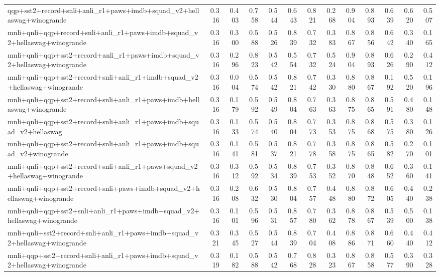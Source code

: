 \begin{table}[t]
\begin{tabular}{lrrrrrrrrrrrr}
    qqp+sst2+record+snli+anli\_r1+paws+imdb+squad\_v2+hellaswag+winogrande & 0.316 & 0.403 & 0.758 & 0.544 & 0.643 & 0.821 & 0.268 & 0.904 & 0.893 & 0.639 & 0.620 & 0.507 \\
    \addlinespace
    mnli+qnli+qqp+record+snli+anli\_r1+paws+imdb+squad\_v2+hellaswag+winogrande & 0.316 & 0.300 & 0.588 & 0.526 & 0.839 & 0.732 & 0.383 & 0.867 & 0.856 & 0.642 & 0.340 & 0.165 \\
    mnli+qnli+qqp+sst2+record+anli\_r1+paws+imdb+squad\_v2+hellaswag+winogrande & 0.316 & 0.296 & 0.823 & 0.542 & 0.554 & 0.732 & 0.524 & 0.904 & 0.893 & 0.626 & 0.290 & 0.412 \\
    mnli+qnli+qqp+sst2+record+snli+anli\_r1+imdb+squad\_v2+hellaswag+winogrande & 0.316 & 0.004 & 0.574 & 0.542 & 0.821 & 0.742 & 0.330 & 0.880 & 0.867 & 0.192 & 0.520 & 0.196 \\
    mnli+qnli+qqp+sst2+record+snli+anli\_r1+paws+imdb+hellaswag+winogrande & 0.316 & 0.179 & 0.592 & 0.549 & 0.804 & 0.763 & 0.363 & 0.875 & 0.865 & 0.591 & 0.480 & 0.148 \\
    mnli+qnli+qqp+sst2+record+snli+anli\_r1+paws+imdb+squad\_v2+hellaswag & 0.316 & 0.133 & 0.574 & 0.540 & 0.804 & 0.773 & 0.353 & 0.875 & 0.868 & 0.575 & 0.380 & 0.126 \\
    mnli+qnli+qqp+sst2+record+snli+anli\_r1+paws+imdb+squad\_v2+winogrande & 0.316 & 0.141 & 0.581 & 0.537 & 0.821 & 0.778 & 0.358 & 0.875 & 0.865 & 0.582 & 0.270 & 0.101 \\
    mnli+qnli+qqp+sst2+record+snli+anli\_r1+paws+squad\_v2+hellaswag+winogrande & 0.316 & 0.312 & 0.592 & 0.534 & 0.839 & 0.753 & 0.352 & 0.870 & 0.848 & 0.652 & 0.360 & 0.141 \\
    mnli+qnli+qqp+sst2+record+snli+paws+imdb+squad\_v2+hellaswag+winogrande & 0.316 & 0.208 & 0.632 & 0.530 & 0.804 & 0.757 & 0.448 & 0.880 & 0.872 & 0.605 & 0.440 & 0.238 \\
    mnli+qnli+qqp+sst2+snli+anli\_r1+paws+imdb+squad\_v2+hellaswag+winogrande & 0.316 & 0.101 & 0.596 & 0.531 & 0.857 & 0.780 & 0.362 & 0.878 & 0.867 & 0.539 & 0.500 & 0.138 \\
    mnli+qnli+sst2+record+snli+anli\_r1+paws+imdb+squad\_v2+hellaswag+winogrande & 0.321 & 0.345 & 0.527 & 0.544 & 0.839 & 0.704 & 0.408 & 0.886 & 0.871 & 0.660 & 0.440 & 0.412 \\
    mnli+qqp+sst2+record+snli+anli\_r1+paws+imdb+squad\_v2+hellaswag+winogrande & 0.319 & 0.182 & 0.588 & 0.542 & 0.768 & 0.828 & 0.323 & 0.867 & 0.858 & 0.577 & 0.390 & 0.328 \\

\end{tabular}
\end{table}
